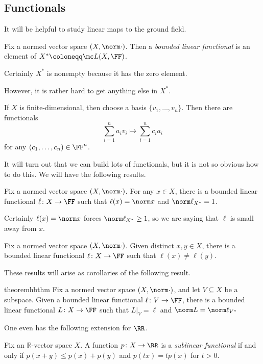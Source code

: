 \documentclass[../notes.tex]{subfiles}
\begin{document}
\subsection{Functionals}
It will be helpful to study linear maps to the ground field.
\begin{definition}[functional]
	Fix a normed vector space $(X,\norm\cdot)$. Then a \textit{bounded linear functional} is an element of $X^*\coloneqq\mc L(X,\FF)$.
\end{definition}
\begin{example}
	Certainly $X^*$ is nonempty because it has the zero element.
\end{example}
However, it is rather hard to get anything else in $X^*$.
\begin{example}
	If $X$ is finite-dimensional, then choose a basis $\{v_1,\ldots,v_n\}$. Then there are functionals
	\[\sum_{i=1}^na_iv_i\mapsto\sum_{i=1}^nc_ia_i\]
	for any $(c_1,\ldots,c_n)\in\FF^n$.
\end{example}
It will turn out that we can build lots of functionals, but it is not so obvious how to do this. We will have the following results.
\begin{corollary}
	Fix a normed vector space $(X,\norm\cdot)$. For any $x\in X$, there is a bounded linear functional $\ell\colon X\to\FF$ such that $\ell(x)=\norm x$ and $\norm\ell_{X^*}=1$.
\end{corollary}
\begin{remark}
	Certainly $\ell(x)=\norm x$ forces $\norm\ell_{X^*}\ge1$, so we are saying that $\ell$ is small away from $x$.
\end{remark}
\begin{corollary}
	Fix a normed vector space $(X,\norm\cdot)$. Given distinct $x,y\in X$, there is a bounded linear functional $\ell\colon X\to\FF$ such that $\ell(x)\ne\ell(y)$.
\end{corollary}
These results will arise as corollaries of the following result.
\begin{restatable}{theorem}{hbthm} \label{thm:hb}
	Fix a normed vector space $(X,\norm\cdot)$, and let $V\subseteq X$ be a subspace. Given a bounded linear functional $\ell\colon V\to\FF$, there is a bounded linear functional $L\colon X\to\FF$ such that $L|_V=\ell$ and $\norm L=\norm\ell_{V^*}$
\end{restatable}
\noindent One even has the following extension for $\RR$.
\begin{definition}
	Fix an $\mathbb R$-vector space $X$. A function $p\colon X\to\RR$ is a \textit{sublinear functional} if and only if $p(x+y)\le p(x)+p(y)$ and $p(tx)=tp(x)$ for $t>0$.
\end{definition}
\end{document}

